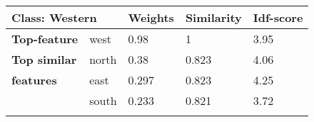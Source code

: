 \begin{table}[htbp]
\begin{tabular}{lllll}
\multicolumn{2}{l|}{\textbf{Class: Western}}                           & \multicolumn{1}{l|}{\textbf{Weights}} & \multicolumn{1}{l|}{\textbf{Similarity}} & \textbf{Idf-score} \\ \hline
\multicolumn{1}{l|}{\textbf{Top-feature}} & \multicolumn{1}{l|}{west}  & \multicolumn{1}{l|}{0.98}             & \multicolumn{1}{l|}{1}                   & 3.95               \\ \hline
\multicolumn{1}{l|}{\textbf{Top similar}} & \multicolumn{1}{l|}{north} & \multicolumn{1}{l|}{0.38}             & \multicolumn{1}{l|}{0.823}               & 4.06               \\
\multicolumn{1}{l|}{\textbf{features}}    & \multicolumn{1}{l|}{east}  & \multicolumn{1}{l|}{0.297}            & \multicolumn{1}{l|}{0.823}               & 4.25               \\
\multicolumn{1}{l|}{}                     & \multicolumn{1}{l|}{south} & \multicolumn{1}{l|}{0.233}            & \multicolumn{1}{l|}{0.821}               & 3.72               \\
                                          &                            &                                       &                                          &                   
\end{tabular}
\end{table}